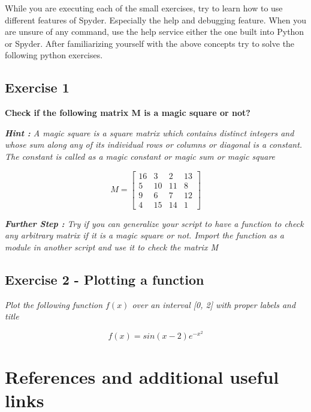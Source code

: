 \documentclass{cmc}
\begin{document}
While you are executing each of the small exercises, try to learn how
to use different features of Spyder. Especially the help and debugging
feature.  When you are unsure of any command, use the help service
either the one built into Python or Spyder.  After familiarizing
yourself with the above concepts try to solve the following python
exercises.

\newpage
\subsection{Exercise 1}
\textbf{Check if the following matrix M is a magic square or not?}

\textit{\textbf{Hint : } A magic square is a square matrix which
  contains distinct integers and whose sum along any of its individual
  rows or columns or diagonal is a constant.  The constant is called
  as a magic constant or magic sum or magic square}

\begin{equation*}
  \label{eq:1}
  M =
  \begin{bmatrix}
    16 & 3  & 2  & 13 \\
    5  & 10 & 11 & 8  \\
    9  & 6  & 7  & 12 \\
    4 & 15 & 14 & 1
  \end{bmatrix}
\end{equation*}

\textit{\textbf{Further Step : } Try if you can generalize your script
  to have a function to check any arbitrary matrix if it is a magic
  square or not.  Import the function as a module in another script
  and use it to check the matrix M}

\subsection{Exercise 2 - Plotting a function}

\textit{Plot the following function $f(x)$ over an interval [0, 2]
  with proper labels and title}

\begin{equation*}
  \label{eq:3}
  f(x) = sin(x - 2)e^{-x^2}
\end{equation*}

\newpage
\section{References and additional useful links}
\label{sec:references}
\end{document}
